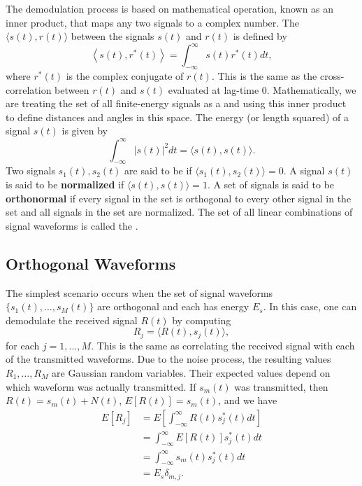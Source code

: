 The demodulation process is based on mathematical operation, known as an inner product, that maps any two signals to a complex number.
The  $\langle s(t) , r(t) \rangle$ between the signals $s(t)$ and $r(t)$ is defined by
\begin{equation*}
\left\langle s (t), r^* (t) \right\rangle
= \int_{-\infty}^{\infty} s(t) r^* (t) dt,
\end{equation*}
where $r^* (t)$ is the complex conjugate of $r(t)$.
This is the same as the cross-correlation between $r(t)$ and $s(t)$ evaluated at lag-time 0.
Mathematically, we are treating the set of all finite-energy signals as a  and using this inner product to define distances and angles in this space.
The energy (or length squared) of a signal $s(t)$ is given by
\[ \int_{-\infty}^{\infty} \left| s(t) \right|^2 dt = \langle s(t),s(t) \rangle. \]
Two signals $s_1 (t),s_2 (t)$ are said to be  if $\langle s_1(t),s_2 (t)\rangle = 0$.
A signal $s(t)$ is said to be \textbf{normalized} if $\langle s(t),s(t) \rangle = 1$.
A set of signals is said to be \textbf{orthonormal} if every signal in the set is orthogonal to every other signal in the set and all signals in the set are normalized.
The set of all linear combinations of signal waveforms is called the .

\subsection{Orthogonal Waveforms}
The simplest scenario occurs when the set of signal waveforms $\{ s_1 (t), \ldots , s_M (t) \}$ are orthogonal and each has energy $E_s$.
In this case, one can demodulate the received signal $R(t)$ by computing
\[ R_j = \langle R(t), s_j (t) \rangle, \]
for each $j=1,\ldots,M$.
This is the same as correlating the received signal with each of the transmitted waveforms.
Due to the noise process, the resulting values $R_1 , \ldots, R_M$ are Gaussian random variables.
Their expected values depend on which waveform was actually transmitted.
If $s_m (t)$ was transmitted, then $R(t) = s_m(t) + N(t)$, $E[R(t)] = s_m(t)$, and we have
\begin{align*}
E \left[R_j \right]
&= E \left[ \int_{-\infty}^{\infty} R(t) s_j^* (t) dt \right] \\
&= \int_{-\infty}^{\infty} E \left[ R(t) \right] s_j^* (t) dt \\
&= \int_{-\infty}^{\infty} s_m (t) s_j^* (t) dt \\
&= E_s \delta_{m,j}.
\end{align*}

